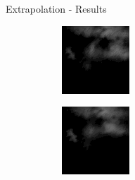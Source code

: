 \documentclass{beamer}
\begin{document}
\begin{frame}{Extrapolation - Results}
	\begin{figure}
	    \begin{subfigure}{.3\textwidth}
	        \centering
	        \includegraphics[width=\linewidth]{fig/extra/out_0.png}
	    \end{subfigure}
	    \begin{subfigure}{.3\textwidth}
	        \centering
	        \includegraphics[width=\linewidth]{fig/extra/out_1.png}

\end{subfigure}
\end{figure}
\end{frame}
\end{document}

